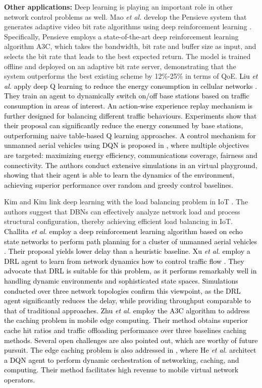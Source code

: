 \documentclass[journal,comsoc,letter]{IEEEtran}
\newcommand{\edit}[1]{\textcolor{black}{#1}}
\newcommand{\rev}[1]{\textcolor{black}{#1}}
\begin{document}
\noindent \textbf{Other applications:} Deep learning is playing an important role in other network control problems as well. Mao \emph{et al.} develop the Pensieve system that generates adaptive video bit rate algorithms using deep reinforcement learning \cite{mao2017neural}. Specifically, Pensieve employs a state-of-the-art deep reinforcement learning algorithm A3C, which takes the bandwidth, bit rate and buffer size as input, and selects the bit rate that leads to the best expected return. The model is trained offline and deployed on an adaptive bit rate server, demonstrating that the system outperforms the best existing scheme by 12\%-25\% in terms of QoE. \edit{Liu \emph{et al.} apply deep Q learning to reduce the energy consumption in cellular networks \cite{liu2018deepnap}. They train an agent to dynamically switch on/off base stations based on traffic consumption in areas of interest. An action-wise experience replay mechanism is further designed for balancing different traffic behaviours. Experiments show that their proposal can significantly reduce the energy consumed by base stations, outperforming naive table-based Q learning approaches.} \rev{A control mechanism for unmanned aerial vehicles using DQN is proposed in \cite{liu2018energy}, where multiple objectives are targeted: maximizing energy efficiency, communications coverage, fairness and connectivity. The authors conduct extensive simulations in an virtual playground, showing that their agent is able to learn the dynamics of the environment, achieving superior performance over random and greedy control baselines.}

Kim and Kim link deep learning with the load balancing problem in IoT \cite{kim2017load}. The authors suggest that DBNs can effectively analyze network load and process structural configuration, thereby achieving efficient load balancing in IoT. \edit{Challita \emph{et al.} employ a deep reinforcement learning algorithm based on echo state networks to perform path planning for a cluster of unmanned aerial vehicles  \cite{challita2018deep}. Their proposal yields lower delay than a heuristic baseline. Xu \emph{et al.} employ a DRL agent to learn from network dynamics how to control traffic flow \cite{xu2018experience}. They advocate that DRL is suitable for this problem, as it performs remarkably well in handling dynamic environments and sophisticated state spaces. Simulations conducted over three network topologies confirm this viewpoint, as the DRL agent significantly reduces the delay, while providing throughput comparable to that of traditional approaches. \rev{Zhu \emph{et al.} employ the A3C algorithm to address the caching problem in mobile edge computing. Their method obtains superior cache hit ratios and traffic offloading  performance over three baselines caching methods. Several open challenges are also pointed out, which are worthy of future pursuit. The edge caching problem is also addressed in \cite{he2017software}, where He \emph{et al.} architect a DQN agent to perform dynamic orchestration of networking, caching, and computing. Their method facilitates high revenue to mobile virtual network operators. }} \\
\end{document}
